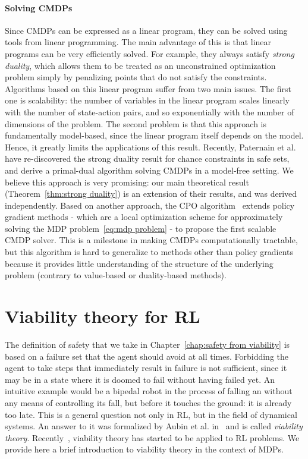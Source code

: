 		\paragraph{Solving CMDPs} Since CMDPs can be expressed as a linear program, they can be solved using tools from linear programming. The main advantage of this is that linear programs can be very efficiently solved. For example, they always satisfy\emph{ strong duality}, which allows them to be treated as an unconstrained optimization problem simply by penalizing points that do not satisfy the constraints. Algorithms based on this linear program suffer from two main issues. The first one is scalability: the number of variables in the linear program scales linearly with the number of state-action pairs, and so exponentially with the number of dimensions of the problem. The second problem is that this approach is fundamentally model-based, since the linear program itself depends on the model. Hence, it greatly limits the applications of this result. Recently, Paternain et al.~\cite{paternain2019safe} have re-discovered the strong duality result for chance constraints in safe sets, and derive a primal-dual algorithm solving CMDPs in a model-free setting. We believe this approach is very promising: our main theoretical result (Theorem~\ref{thm:strong duality}) is an extension of their results, and was derived independently. Based on another approach, the CPO algorithm~\cite{achiam2017constrained} extends policy gradient methods - which are a local optimization scheme for approximately solving the MDP problem~\eqref{eq:mdp problem} - to propose the first scalable CMDP solver. This is a milestone in making CMDPs computationally tractable, but this algorithm is hard to generalize to methods other than policy gradients because it provides little understanding of the structure of the underlying problem (contrary to value-based or duality-based methods).
		
	\section{Viability theory for RL} \label{sec:preliminary viability}
	The definition of safety that we take in Chapter~\ref{chap:safety from viability} is based on a failure set that the agent should avoid at all times. Forbidding the agent to take steps that immediately result in failure is not sufficient, since it may be in a state where it is doomed to fail without having failed yet. An intuitive example would be a bipedal robot in the process of falling an without any means of controlling its fall, but before it touches the ground: it is already too late. This is a general question not only in RL, but in the field of dynamical systems. An answer to it was formalized by Aubin et al. in~\cite{aubin2011viability} and is called\emph{ viability theory}. Recently~\cite{heim2020learnable}, viability theory has started to be applied to RL problems. We provide here a brief introduction to viability theory in the context of MDPs.

